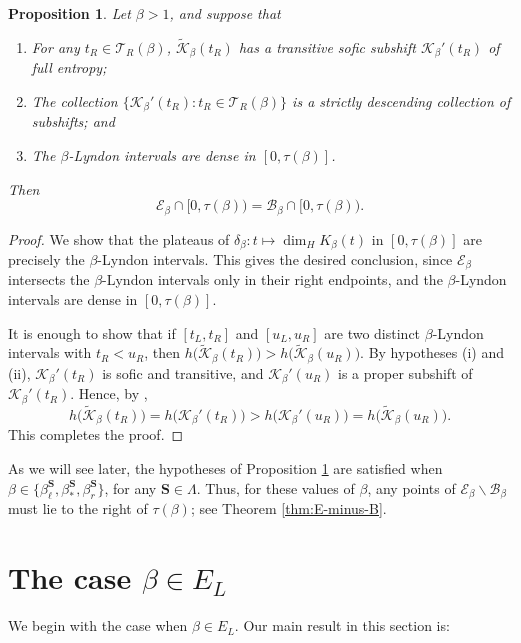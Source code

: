 \documentclass[11pt]{amsart}
\newtheorem{proposition}[theorem]{Proposition}
\theoremstyle{definition}
\theoremstyle{remark}
\numberwithin{equation}{section}
\newcommand{\BB}{\mathscr{B}}
\newcommand{\EE}{\mathscr{E}}
\newcommand{\Kt}{\widetilde{\mathcal{K}}}
\newcommand{\cs}{ {\mathbf{S}}}
\newcommand{\La}{\Lambda}
\begin{document}
\begin{proposition} \label{prop:E-B-equality}
Let $\beta{>1}$, and suppose that
\begin{enumerate}[{\rm(i)}]
\item For any $t_R\in\mathcal{T}_R(\beta)$, $\Kt_\beta(t_R)$ has a transitive sofic subshift $\mathcal{K}_\beta'(t_R)$ of full entropy;
\item The collection $\{\mathcal{K}_\beta'(t_R): t_R\in\mathcal{T}_R(\beta)\}$ is a strictly descending collection of subshifts; and
\item The $\beta$-Lyndon intervals are dense in $[0,\tau(\beta)]$.
\end{enumerate}
Then
\[
\EE_\beta\cap[0,\tau(\beta))=\BB_\beta\cap[0,\tau(\beta)).
\]
\end{proposition}

\begin{proof}
We show that the plateaus of $\delta_\beta: t\mapsto\dim_H K_\beta(t)$ in $[0,\tau(\beta)]$ are precisely the $\beta$-Lyndon intervals. This gives the desired conclusion, since $\EE_\beta$ intersects the $\beta$-Lyndon intervals only in their right endpoints, and the $\beta$-Lyndon intervals are dense in $[0,\tau(\beta)]$.

It is enough to show that if $[t_L,t_R]$ and $[u_L,u_R]$ are two distinct $\beta$-Lyndon intervals with $t_R<u_R$, then $h\big(\Kt_\beta(t_R)\big)>h\big(\Kt_\beta(u_R)\big)$. By hypotheses (i) and (ii), $\mathcal{K}_\beta'(t_R)$ is sofic and transitive, and $\mathcal{K}_\beta'(u_R)$ is a proper subshift of $\mathcal{K}_\beta'(t_R)$. Hence, by \cite[Corollary 4.4.9]{Lind_Marcus_1995},
\[
h\big(\Kt_\beta(t_R)\big)=h\big(\mathcal{K}_\beta'(t_R)\big)>h\big(\mathcal{K}_\beta'(u_R)\big)=h\big(\Kt_\beta(u_R)\big).
\]
This completes the proof.
\end{proof}

As we will see later, the hypotheses of Proposition \ref{prop:E-B-equality} are satisfied when $\beta\in\{\beta_\ell^\cs, \beta_*^\cs,\beta_r^\cs\}$, for any $\cs\in\La$. Thus, for these values of $\beta$, any points of $\EE_\beta\backslash\BB_\beta$ must lie to the right of $\tau(\beta)$; see Theorem \ref{thm:E-minus-B}.

 

\section{The case $\beta\in E_L$} \label{sec:beta-in-E}

We begin with the case when $\beta\in E_L$. Our main result in this section is:
\end{document}
